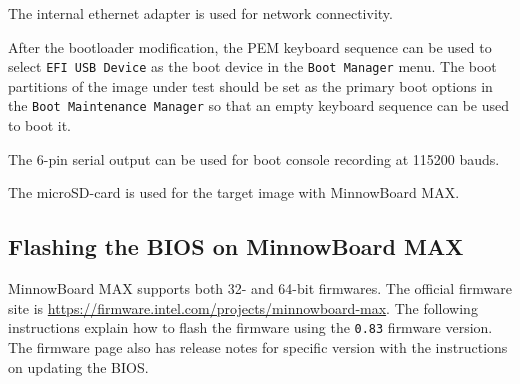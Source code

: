 \documentclass[a4paper,11pt]{article}
\newcommand{\cmd}[1]{\texttt{#1}}
\begin{document}
The internal ethernet adapter is used for network connectivity.

After the bootloader modification, the PEM keyboard sequence can be used to select \cmd{EFI USB Device} as the boot device in the \cmd{Boot Manager} menu. The boot partitions of the image under test should be set as the primary boot options in the \cmd{Boot Maintenance Manager} so that an empty keyboard sequence can be used to boot it.

The 6-pin serial output can be used for boot console recording at 115200 bauds.

The microSD-card is used for the target image with MinnowBoard MAX.

\subsection{Flashing the BIOS on MinnowBoard MAX}

MinnowBoard MAX supports both 32- and 64-bit firmwares. The official firmware site is \url{https://firmware.intel.com/projects/minnowboard-max}. The following instructions explain how to flash the firmware using the \cmd{0.83} firmware version. The firmware page also has release notes for specific version with the instructions on updating the BIOS.
\end{document}
